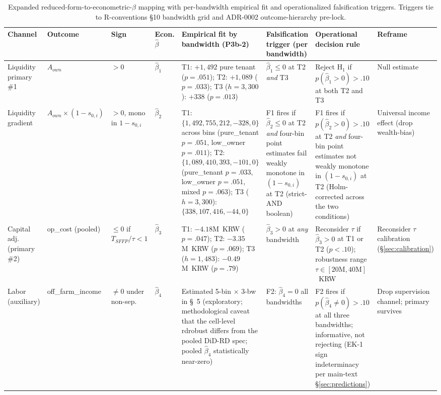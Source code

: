 \documentclass[11pt, a4paper]{article}
\begin{document}
\begin{landscape}
\begin{table}[ht]
\centering
\caption{Expanded reduced-form-to-econometric-$\beta$ mapping with per-bandwidth empirical fit and operationalized falsification triggers. Triggers tie to R-conventions \S 10 bandwidth grid and ADR-0002 outcome-hierarchy pre-lock.}
\label{tab:appB-mapping}
\small
\setlength{\tabcolsep}{4pt}
\begin{tabular}{p{2.0cm} p{1.6cm} p{0.9cm} p{1.0cm} p{3.6cm} p{3.4cm} p{4.8cm} p{2.0cm}}
\toprule
Channel & Outcome & Sign & Econ. $\hat\beta$ & Empirical fit by bandwidth (P3b-2) & Falsification trigger (per bandwidth) & Operational decision rule & Reframe \\
\midrule
Liquidity primary \#1 \citep{CarterOlinto2003_liquidity} & $A_{own}$ & $>0$ & $\hat\beta_1$ & T1: $+1{,}492$ pure tenant ($p\!=\!.051$); T2: $+1{,}089$ ($p\!=\!.033$); T3 ($h\!=\!3{,}300$): $+338$ ($p\!=\!.013$) & $\hat\beta_1 \le 0$ at T2 \emph{and} T3 & Reject H$_1$ if $p(\hat\beta_1 > 0) > .10$ at both T2 and T3 & Null estimate \\
Liquidity gradient \citep{CarterOlinto2003_liquidity} & $A_{own} \times (1-s_{0,i})$ & $> 0$, mono in $1-s_{0,i}$ & $\hat\beta_2$ & T1: $\{1{,}492, 755, 212, -328, 0\}$ across bins (pure\_tenant $p\!=\!.051$, low\_owner $p\!=\!.011$); T2: $\{1{,}089, 410, 393, -101, 0\}$ (pure\_tenant $p\!=\!.033$, low\_owner $p\!=\!.051$, mixed $p\!=\!.063$); T3 ($h\!=\!3{,}300$): $\{338, 107, 416, -44, 0\}$ & F1 fires if $\hat\beta_2 \le 0$ at T2 \emph{and} four-bin point estimates fail weakly monotone in $(1-s_{0,i})$ at T2 (strict-AND boolean) & F1 fires if $p(\hat\beta_2 > 0) > .10$ at T2 \emph{and} four-bin point estimates not weakly monotone in $(1-s_{0,i})$ at T2 (Holm-corrected across the two conditions) & Universal income effect (drop wealth-bias) \\
Capital adj. (primary \#2) \citep{Kazukauskas2013_disinvestment} & op\_cost (pooled) & $\le 0$ if $T_{SFFP}/\tau \!<\! 1$ & $\hat\beta_3$ & T1: $-4.18$M~KRW ($p\!=\!.047$); T2: $-3.35$M~KRW ($p\!=\!.069$); T3 ($h\!=\!1{,}483$): $-0.49$M~KRW ($p\!=\!.79$) & $\hat\beta_3 > 0$ at \emph{any} bandwidth & Reconsider $\tau$ if $\hat\beta_3 > 0$ at T1 or T2 ($p < .10$); robustness range $\tau \in [20\text{M}, 40\text{M}]$~KRW & Reconsider $\tau$ calibration (\S\ref{sec:calibration}) \\
Labor (auxiliary) \citep{EswaranKotwal1986_supervision} & off\_farm\_income & $\ne 0$ under non-sep. & $\hat\beta_4$ & Estimated 5-bin $\times$ 3-bw in \S~5 (exploratory; methodological caveat that the cell-level rdrobust differs from the pooled DiD-RD spec; pooled $\hat\beta_4$ statistically near-zero) & F2: $\hat\beta_4 = 0$ all bandwidths & F2 fires if $p(\hat\beta_4 \ne 0) > .10$ at all three bandwidths; informative, not rejecting (EK-1 sign indeterminacy per main-text \S\ref{sec:predictions}) & Drop supervision channel; primary survives \\

\end{tabular}
\end{table}
\end{landscape}
\end{document}
